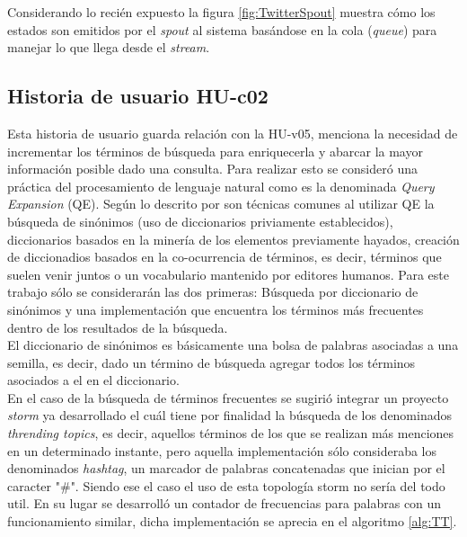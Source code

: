 Considerando lo recién expuesto la figura \ref{fig:TwitterSpout} muestra cómo los estados son emitidos por el \textit{spout} al sistema basándose en la cola (\textit{queue}) para manejar lo que llega desde el \textit{stream}.

\subsection{Historia de usuario HU-c02}
\label{subsec:HU-c02}

Esta historia de usuario guarda relación con la HU-v05, menciona la necesidad de incrementar los términos de búsqueda para enriquecerla y abarcar la mayor información posible dado una consulta. Para realizar esto se consideró una práctica del procesamiento de lenguaje natural como es la denominada \textit{Query Expansion} (QE). Según lo descrito por \cite{IRQE} son técnicas comunes al utilizar QE la búsqueda de sinónimos (uso de diccionarios priviamente establecidos), diccionarios basados en la minería de los elementos previamente hayados, creación de diccionadios basados en la co-ocurrencia de términos, es decir, términos que suelen venir juntos o un vocabulario mantenido por editores humanos. Para este trabajo sólo se considerarán las dos primeras: Búsqueda por diccionario de sinónimos y una implementación que encuentra los términos más frecuentes dentro de los resultados de la búsqueda.\\

El diccionario de sinónimos es básicamente una bolsa de palabras asociadas a una semilla, es decir, dado un término de búsqueda agregar todos los términos asociados a el en el diccionario.\\

En el caso de la búsqueda de términos frecuentes se sugirió integrar un proyecto \textit{storm} ya desarrollado el cuál tiene por finalidad la búsqueda de los denominados \textit{thrending topics}, es decir, aquellos términos de los que se realizan más menciones en un determinado instante, pero aquella implementación sólo consideraba los denominados \textit{hashtag}, un marcador de palabras concatenadas que inician por el caracter "\#". Siendo ese el caso el uso de esta topología storm no sería del todo util. En su lugar se desarrolló un contador de frecuencias para palabras con un funcionamiento similar, dicha implementación se aprecia en el algoritmo \ref{alg:TT}.\\

